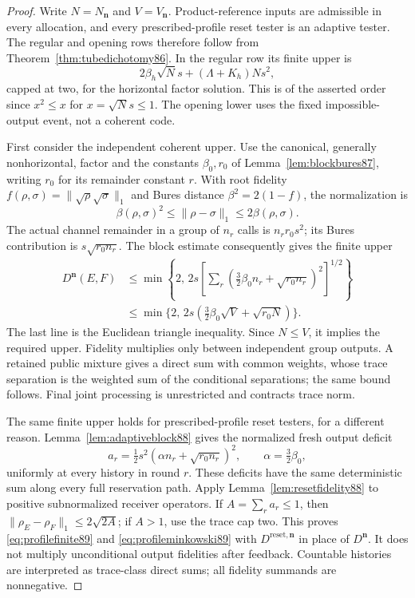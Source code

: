 \begin{proof}
Write $N=N_{\boldsymbol n}$ and $V=V_{\boldsymbol n}$.
Product-reference inputs are admissible in every allocation, and every prescribed-profile reset tester is an adaptive tester.  The regular and opening
rows therefore follow from Theorem~\ref{thm:tubedichotomy86}.
In the regular row its finite upper is
\[
 2\beta_h\sqrt N s+(\Lambda+K_h)Ns^2,
\]
capped at two, for the horizontal factor solution.  This is of the
asserted order since $x^2\le x$ for $x=\sqrt N s\le1$.
The opening lower uses the fixed impossible-output event, not a
coherent code.

First consider the independent coherent upper.  Use the canonical, generally nonhorizontal,
factor and the constants $\beta_0,r_0$ of
Lemma~\ref{lem:blockbures87}, writing $r_0$ for its remainder constant $r$.
With root fidelity
$f(\rho,\sigma)=\|\sqrt\rho\sqrt\sigma\|_1$ and Bures distance
$\beta^2=2(1-f)$, the normalization is
\[
 \beta(\rho,\sigma)^2\le\|\rho-\sigma\|_1
                         \le2\beta(\rho,\sigma).
\]
The actual channel remainder in a group of $n_r$ calls is
$n_r r_0s^2$; its Bures contribution is $s\sqrt{r_0n_r}$.
The block estimate consequently gives the finite upper
\begin{align}
 D^{\boldsymbol n}(E,F)
 &\le \min\left\{2,\,
  2s\left[\sum_r
      (\tfrac32\beta_0n_r+\sqrt{r_0n_r})^2\right]^{1/2}\right\}
                                                   \label{eq:profilefinite89}\\
 &\le\min\{2,\,2s(\tfrac32\beta_0\sqrt V+\sqrt{r_0N})\}.
                                                   \label{eq:profileminkowski89}
\end{align}
The last line is the Euclidean triangle inequality.  Since $N\le V$,
it implies the required upper.  Fidelity multiplies only between
independent group outputs.  A retained public mixture gives a direct
sum with common weights, whose trace separation is the weighted sum
of the conditional separations; the same bound follows.  Final
joint processing is unrestricted and contracts trace norm.

The same finite upper holds for prescribed-profile reset testers,
for a different reason.  Lemma~\ref{lem:adaptiveblock88} gives the
normalized fresh output deficit
\[
 a_r=\tfrac12s^2(\alpha n_r+\sqrt{r_0n_r})^2,
 \qquad \alpha=\tfrac32\beta_0,
\]
uniformly at every history in round $r$.  These deficits have the
same deterministic sum along every full reservation path.  Apply
Lemma~\ref{lem:resetfidelity88} to positive subnormalized receiver
operators.  If $A=\sum_ra_r\le1$, then
$\|\rho_E-\rho_F\|_1\le2\sqrt{2A}$; if $A>1$, use the trace cap two.
This proves \eqref{eq:profilefinite89} and
\eqref{eq:profileminkowski89} with $D^{\mathrm{reset},\boldsymbol n}$
in place of $D^{\boldsymbol n}$.  It does not multiply unconditional
output fidelities after feedback.  Countable histories are interpreted
as trace-class direct sums; all fidelity summands are nonnegative.


\end{proof}
